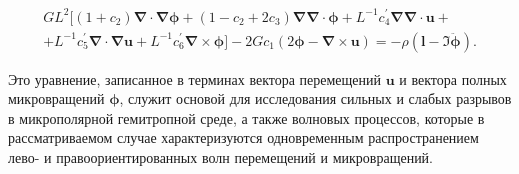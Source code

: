 \vspace{-10mm}



\begin{multline}

GL^2\bigl[(1+c_2){\boldsymbol\nabla}\cdot{\boldsymbol\nabla}{\boldsymbol\phi}+(1-c_2+2c_3){\boldsymbol\nabla}{\boldsymbol\nabla}\cdot{\boldsymbol\phi}+L^{-1}c^\prime_4{\boldsymbol\nabla}{\boldsymbol\nabla}\cdot{\mathbf u}+ \\

+L^{-1}c^\prime_5{\boldsymbol\nabla}\cdot{\boldsymbol\nabla}{\mathbf u}

+L^{-1}c^\prime_6{\boldsymbol\nabla}\times{\boldsymbol\phi}\bigr]-2Gc_1(2{\boldsymbol\phi}-{\boldsymbol\nabla}\times{\mathbf u})=-\rho({\mathbf l}-{\mathfrak I}\ddot{\boldsymbol\phi}).

\label{eq:dynamic-eqs-2}

\end{multline}

Это уравнение, записанное в терминах вектора перемещений \({\mathbf u}\) и вектора полных микровращений \({\boldsymbol\phi}\), служит основой для исследования сильных и слабых разрывов в микрополярной гемитропной среде, а также волновых процессов, которые в рассматриваемом случае характеризуются одновременным распространением лево- и правоориентированных волн перемещений и микровращений.







